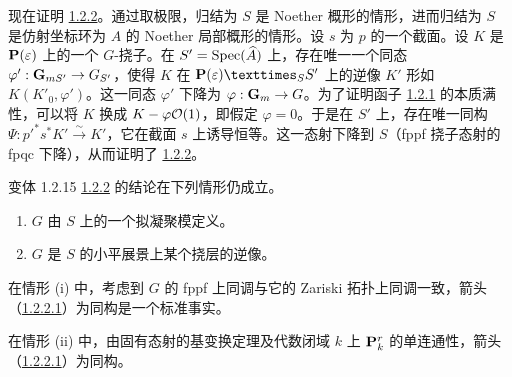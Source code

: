 \subsubsection{}
现在证明 \hyperref[XVIII.thm1.2.2]{1.2.2}。通过取极限，归结为 $S$ 是 Noether 概形的情形，进而归结为 $S$ 是仿射坐标环为 $A$ 的 Noether 局部概形的情形。设 $s$ 为 $p$ 的一个截面。设 $K$ 是 $\mathbf{P}(\varepsilon)$ 上的一个 $G$-挠子。在 $S'=\operatorname{Spec}(\widehat{A})$ 上，存在唯一一个同态 $\varphi':\mathbf{G}_{mS'}\rightarrow G_{S'}$，使得 $K$ 在 $\fprod{\PP(\epsilon)}{S'}{S}$ 上的逆像 $K'$ 形如 $K(K'_{0},\varphi')$。这一同态 $\varphi'$ 下降为 $\varphi:\mathbf{G}_{m}\rightarrow G$。为了证明函子 \hyperref[XVIII.subsubsec1.2.1]{1.2.1} 的本质满性，可以将 $K$ 换成 $K-\varphi{\mathcal O}(1)$，即假定 $\varphi=0$。于是在 $S'$ 上，存在唯一同构 $\Psi:{p'}^{\ast}s^{\ast}K'\xrightarrow{\sim}K'$，它在截面 $s$ 上诱导恒等。这一态射下降到 $S$（fppf 挠子态射的 fpqc 下降），从而证明了 \hyperref[XVIII.thm1.2.2]{1.2.2}。

\begin{enonce*}{变体 1.2.15}
\hyperref[XVIII.thm1.2.2]{1.2.2} 的结论在下列情形仍成立。
\begin{enumerate}
\renewcommand{\theenumi}{\roman{enumi}}
\renewcommand{\labelenumi}{(\theenumi)}
\item $G$ 由 $S$ 上的一个拟凝聚模定义。

\item $G$ 是 $S$ 的小平展景上某个挠层的逆像。
\end{enumerate}
\end{enonce*}

在情形 (i) 中，考虑到 $G$ 的 fppf 上同调与它的 Zariski 拓扑上同调一致，箭头（\hyperref[XVIII.par1.2.2.1]{1.2.2.1}）为同构是一个标准事实。

在情形 (ii) 中，由固有态射的基变换定理及代数闭域 $k$ 上 $\mathbf{P}^{r}_{k}$ 的单连通性，箭头（\hyperref[XVIII.par1.2.2.1]{1.2.2.1}）为同构。

